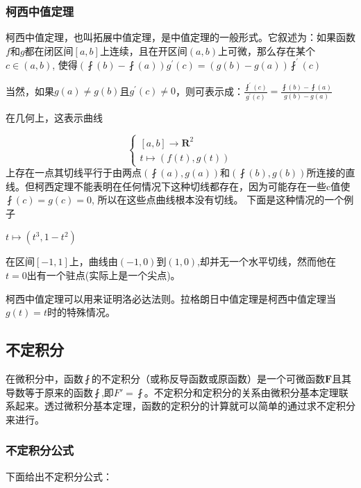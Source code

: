 \documentclass[UTF8]{ctexbook}
\newcommand{\derivative}{^\prime}
\newcommand{\fDerivative}[1]{\fint\derivative(#1)}
\newcommand{\defFunction}[1]{\fint(#1)}
\begin{document}
{{{\subsubsection{柯西中值定理}{
  柯西中值定理，也叫拓展中值定理，是中值定理的一般形式。它叙述为：如果函数$f$和$g$都在闭区间$[a,b]$上连续，且在开区间$(a,b)$上可微，那么存在某个$c \in (a,b)$,
  使得$(\defFunction{b} - \defFunction{a})g\derivative(c) = (g(b)-g(a))\fDerivative{c}$

  当然，如果$g(a) \neq g(b)$且$g\derivative(c) \neq 0$，则可表示成：$\frac{\fDerivative{c}}{g\derivative(c)} = \frac{\defFunction{b} - \defFunction{a}}{g(b) - g(a)}$

  在几何上，这表示曲线

  $$
    \begin{cases}
      [a,b] \to \mathbf{R}^2 \\
      t \mapsto (f(t), g(t))
    \end{cases}
  $$
  上存在一点其切线平行于由两点$(\defFunction{a}, g(a))$和$(\defFunction{b}, g(b))$所连接的直线。但柯西定理不能表明在任何情况下这种切线都存在，因为可能存在一些c值使$\defFunction{c} = g(c) = 0$, 所以在这些点曲线根本没有切线。
  下面是这种情况的一个例子

  $t \mapsto (t^3, 1-t^2)$

  在区间$[-1,1]$上，曲线由$(-1, 0)$到$(1,0)$,却并无一个水平切线，然而他在$t = 0$出有一个驻点(实际上是一个尖点)。

  柯西中值定理可以用来证明洛必达法则。拉格朗日中值定理是柯西中值定理当$g(t) = t$时的特殊情况。
}%

}%

\subsection{不定积分}{
  在微积分中，函数$\fint$的不定积分（或称反导函数或原函数）是一个可微函数$\mathbf{F}$且其导数等于原来的函数$\fint$,即$F\prime = \fint$。不定积分和定积分的关系由微积分基本定理联系起来。透过微积分基本定理，函数的定积分的计算就可以简单的通过求不定积分来进行。

  \subsubsection{不定积分公式}{
    下面给出不定积分公式：

}}}}
\end{document}

